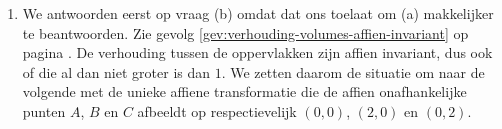\documentclass[main.tex]{subfiles}
\begin{document}
\begin{enumerate}
\begin{enumerate}[(a)]
\[\begin{array}{ccc|c}
        1 & 0 & -2 & 0
      \end{array}
    \right)
    \]
    \[
    \leftrightarrow
    \left(
      \begin{array}{ccc|c}
        1 & 0 & -2 & 0\\
        0 & 1 & 1 & 0
      \end{array}
    \right)
    \leftrightarrow (\lambda,\mu,\nu) \in \{ (2t,-t,t) \mid t\in \mathbb{R} \}
    \]
    \[
    \pi\cap S \leftrightarrow
    \begin{pmatrix}
      2\\1\\-2\\0
    \end{pmatrix}
    +2t
    \begin{pmatrix}
      0\\1\\0\\0
    \end{pmatrix}
    -t
    \begin{pmatrix}
      -1\\0\\1\\0
    \end{pmatrix}
    +t
    \begin{pmatrix}
      -1\\0\\0\\1
    \end{pmatrix}
    = 
    \begin{pmatrix}
      2\\1\\-2\\0
    \end{pmatrix}
    +t
    \begin{pmatrix}
      0\\2\\-1\\1
    \end{pmatrix}
    \]
  \end{enumerate}
\item
  We antwoorden eerst op vraag (b) omdat dat ons toelaat om (a) makkelijker te beantwoorden.
  Zie gevolg \ref{gev:verhouding-volumes-affien-invariant} op pagina \pageref{gev:verhouding-volumes-affien-invariant}.
  De verhouding tussen de oppervlakken zijn affien invariant, dus ook of die al dan niet groter is dan $1$.
  We zetten daarom de situatie om naar de volgende met de unieke affiene transformatie die de affien onafhankelijke punten $A$, $B$ en $C$ afbeeldt op respectievelijk $(0,0)$, $(2,0)$ en $(0,2)$.


\end{enumerate}
\end{document}
